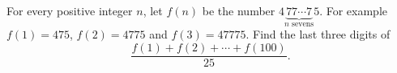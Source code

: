 For every positive integer $n$, let $f(n)$ be the number $4\underbrace{77\cdots7}_{n\text{ sevens}}5$. For example $f(1)=475$, $f(2)=4775$ and $f(3)=47775$. Find the last three digits of
\[\dfrac{f(1)+f(2)+\cdots+f(100)}{25}.\]
